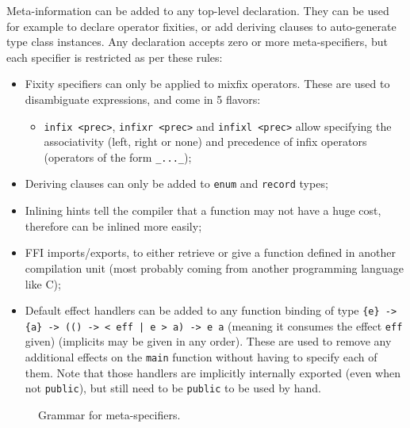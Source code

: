 Meta-information can be added to any top-level declaration.
They can be used for example to declare operator fixities, or add deriving clauses to auto-generate type class instances.
Any declaration accepts zero or more meta-specifiers, but each specifier is restricted as per these rules:
\begin{itemize}
	\item Fixity specifiers can only be applied to mixfix operators.
	      These are used to disambiguate expressions, and come in 5 flavors:
	      \begin{itemize}
		      \item \verb|infix <prec>|, \verb|infixr <prec>| and \verb|infixl <prec>| allow specifying the associativity (left, right or none) and precedence of infix operators (operators of the form \verb|_..._|);
	      \end{itemize}
	\item Deriving clauses can only be added to \verb|enum| and \verb|record| types;
	\item Inlining hints tell the compiler that a function may not have a huge cost, therefore can be inlined more easily;
	\item FFI imports/exports, to either retrieve or give a function defined in another compilation unit (most probably coming from another programming language like C);
	\item Default effect handlers can be added to any function binding of type \texttt{\{e\} -> \{a\} -> (() -> < eff | e > a) -> e a} (meaning it consumes the effect \verb|eff| given) (implicits may be given in any order).
	      These are used to remove any additional effects on the \verb|main| function without having to specify each of them.
	      Note that those handlers are implicitly internally exported (even when not \verb|public|), but still need to be \verb|public| to be used by hand.
\end{itemize}

\begin{figure}[H]
	\centering


	\caption{Grammar for meta-specifiers.}
	\label{fig:zilch-grammar-declarations-meta-grammar}
\end{figure}

